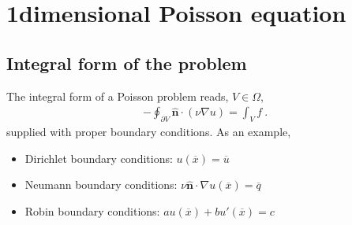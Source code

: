 \documentclass[letterpaper,10pt,english]{jupyterBook}
\begin{document}
\sphinxstepscope


\section{1\sphinxhyphen{}dimensional Poisson equation}
\label{\detokenize{ch/pde/fvm-poisson-1d:dimensional-poisson-equation}}\label{\detokenize{ch/pde/fvm-poisson-1d:pde-fvm-poisson-1d}}\label{\detokenize{ch/pde/fvm-poisson-1d::doc}}

\subsection{Integral form of the problem}
\label{\detokenize{ch/pde/fvm-poisson-1d:integral-form-of-the-problem}}
\sphinxAtStartPar
The integral form of a Poisson problem reads,  \(V \in \Omega\),
\begin{equation*}
\begin{split}- \oint_{\partial V} \hat{\mathbf{n}} \cdot \left( \nu \nabla u \right) = \int_{V} f \ .\end{split}
\end{equation*}
\sphinxAtStartPar
supplied with proper boundary conditions. As an example,
\begin{itemize}
\item {} 
\sphinxAtStartPar
Dirichlet boundary conditions: \(u(\overline{x}) = \overline{u}\)

\item {} 
\sphinxAtStartPar
Neumann boundary conditions: \(\nu \hat{\mathbf{n}} \cdot \nabla u(\overline{x}) = \overline{q}\)

\item {} 
\sphinxAtStartPar
Robin boundary conditions: \(a u(\overline{x}) + b u'(\overline{x}) = c\)

\end{itemize}

\sphinxAtStartPar
{}
\end{document}
